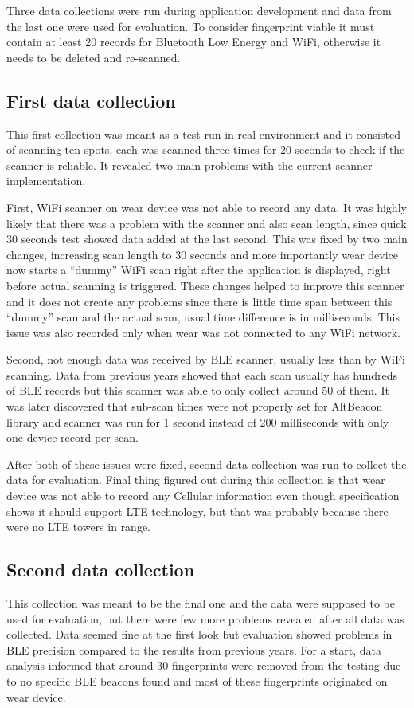 Three data collections were run during application development and data from the last one were used for evaluation. To consider fingerprint viable it must contain at least 20 records for Bluetooth Low Energy and WiFi, otherwise it needs to be deleted and re-scanned.

\subsection{First data collection}\label{sec:FirstDataCollection}
This first collection was meant as a test run in real environment and it consisted of scanning ten spots, each was scanned three times for 20 seconds to check if the scanner is reliable. It revealed two main problems with the current scanner implementation.

First, WiFi scanner on wear device was not able to record any data. It was highly likely that there was a problem with the scanner and also scan length, since quick 30 seconds test showed data added at the last second. This was fixed by two main changes, increasing scan length to 30 seconds and more importantly wear device now starts a \enquote{dummy} WiFi scan right after the application is displayed, right before actual scanning is triggered. These changes helped to improve this scanner and it does not create any problems since there is little time span between this \enquote{dummy} scan and the actual scan, usual time difference is in milliseconds. This issue was also recorded only when wear was not connected to any WiFi network.

Second, not enough data was received by BLE scanner, usually less than by WiFi scanning. Data from previous years showed that each scan usually has hundreds of BLE records but this scanner was able to only collect around 50 of them. It was later discovered that sub-scan times were not properly set for AltBeacon library and scanner was run for 1 second instead of 200 milliseconds with only one device record per scan.

After both of these issues were fixed, second data collection was run to collect the data for evaluation. Final thing figured out during this collection is that wear device was not able to record any Cellular information even though specification shows it should support LTE technology, but that was probably because there were no LTE towers in range. 

\subsection{Second data collection}\label{sec:SecondDataCollection}
This collection was meant to be the final one and the data were supposed to be used for evaluation, but there were few more problems revealed after all data was collected. Data seemed fine at the first look but evaluation showed problems in BLE precision compared to the results from previous years. For a start, data analysis informed that around 30 fingerprints were removed from the testing due to no specific BLE beacons found and most of these fingerprints originated on wear device.

